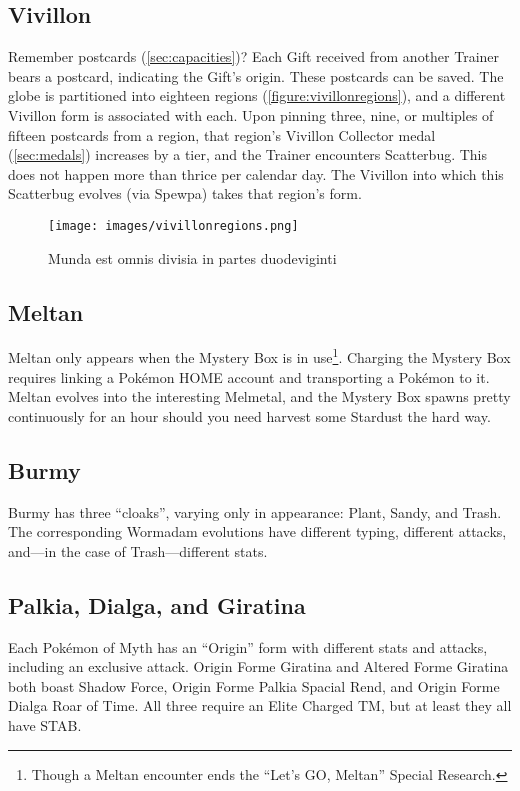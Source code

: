 \subsection{Vivillon\label{subsec:vivillon}}
Remember postcards (\autoref{sec:capacities})?
Each Gift received from another Trainer bears a postcard, indicating the Gift's origin.
These postcards can be saved.
The globe is partitioned into eighteen regions (\autoref{figure:vivillonregions}),
  and a different Vivillon form is associated with each.
Upon pinning three, nine, or multiples of fifteen postcards from a region,
  that region's Vivillon Collector medal (\autoref{sec:medals}) increases
  by a tier, and the Trainer encounters Scatterbug.
This does not happen more than thrice per calendar day.
The Vivillon into which this Scatterbug evolves (via Spewpa) takes that region's form.
\begin{figure}
\centering
\texttt{[image: images/vivillonregions.png]}
\caption{Munda est omnis divisia in partes duodeviginti\label{figure:vivillonregions}}
\end{figure}

\subsection{Meltan\label{subsec:meltan}}
Meltan only appears when the Mystery Box is in use\footnote{Though a Meltan encounter ends the ``Let's GO, Meltan'' Special Research.}.
Charging the Mystery Box requires linking a Pokémon HOME account and transporting
  a Pokémon to it.
Meltan evolves into the interesting Melmetal, and the Mystery
  Box spawns pretty continuously for an hour should you need harvest some Stardust
  the hard way.

\subsection{Burmy}
Burmy has three ``cloaks'', varying only in appearance: Plant, Sandy, and Trash.
The corresponding Wormadam evolutions have different typing, different attacks,
 and---in the case of Trash---different stats.

\subsection{Palkia, Dialga, and Giratina}
Each Pokémon of Myth has an ``Origin'' form with different stats and attacks, including
 an exclusive attack.
Origin Forme Giratina and Altered Forme Giratina both boast Shadow Force, Origin Forme Palkia Spacial Rend,
 and Origin Forme Dialga Roar of Time.
All three require an Elite Charged TM, but at least they all have STAB\@.

